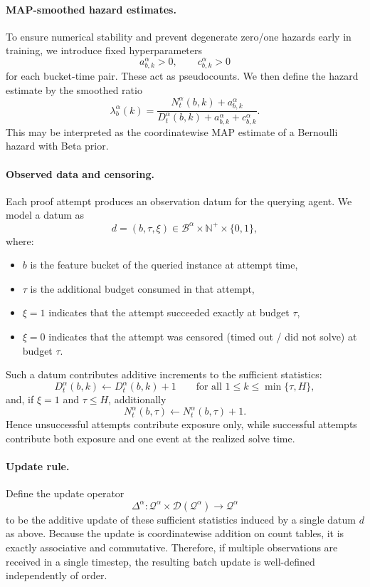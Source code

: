 \documentclass[letterpaper]{article} %
\begin{document}
\paragraph{MAP-smoothed hazard estimates.}
To ensure numerical stability and prevent degenerate zero/one hazards early in training, we introduce fixed hyperparameters
\[
a^\alpha_{b,k}>0,\qquad c^\alpha_{b,k}>0
\]
for each bucket-time pair. These act as pseudocounts. We then define the hazard estimate by the smoothed ratio
\[
\lambda^\alpha_b(k)
=
\frac{N^\alpha_t(b,k)+a^\alpha_{b,k}}
{D^\alpha_t(b,k)+a^\alpha_{b,k}+c^\alpha_{b,k}}.
\]
This may be interpreted as the coordinatewise MAP estimate of a Bernoulli hazard with Beta prior.

\paragraph{Observed data and censoring.}
Each proof attempt produces an observation datum for the querying agent. We model a datum as
\[
d=(b,\tau,\xi)\in \mathcal B^\alpha \times \mathbb N^+ \times \{0,1\},
\]
where:
\begin{itemize}
    \item $b$ is the feature bucket of the queried instance at attempt time,
    \item $\tau$ is the additional budget consumed in that attempt,
    \item $\xi=1$ indicates that the attempt succeeded exactly at budget $\tau$,
    \item $\xi=0$ indicates that the attempt was censored (timed out / did not solve) at budget $\tau$.
\end{itemize}

Such a datum contributes additive increments to the sufficient statistics:
\[
D^\alpha_t(b,k) \leftarrow D^\alpha_t(b,k)+1
\qquad\text{for all }1\le k\le \min\{\tau,H\},
\]
and, if $\xi=1$ and $\tau\le H$, additionally
\[
N^\alpha_t(b,\tau) \leftarrow N^\alpha_t(b,\tau)+1.
\]
Hence unsuccessful attempts contribute exposure only, while successful attempts contribute both exposure and one event at the realized solve time.

\paragraph{Update rule.}
Define the update operator
\[
\Delta^\alpha : \mathcal Q^\alpha \times \mathcal D(\mathcal Q^\alpha)\to \mathcal Q^\alpha
\]
to be the additive update of these sufficient statistics induced by a single datum $d$ as above. Because the update is coordinatewise addition on count tables, it is exactly associative and commutative. Therefore, if multiple observations are received in a single timestep, the resulting batch update is well-defined independently of order.
\end{document}
